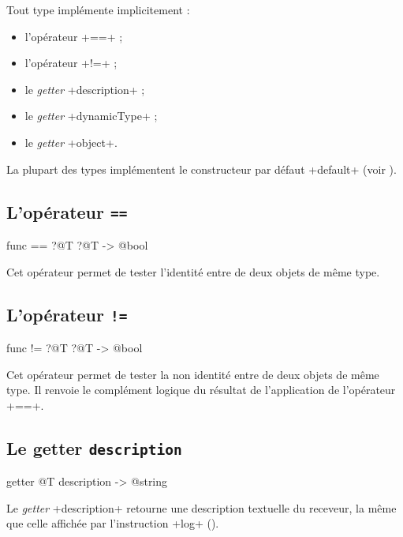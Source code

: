 Tout type implémente implicitement :
\begin{itemize}
  \item l'opérateur \ggs+==+ ;
  \item l'opérateur \ggs+!=+ ;
  \item le \emph{getter} \ggs+description+ ;
  \item le \emph{getter} \ggs+dynamicType+ ;
  \item le \emph{getter} \ggs+object+.
\end{itemize}

La plupart des types implémentent le constructeur par défaut \ggs+default+ (voir ). 


\subsection{L'opérateur \texttt{==}}

\begin{galgas}
func == ?@T ?@T -> @bool
\end{galgas}

Cet opérateur permet de tester l'identité entre de deux objets de même type. 

\subsection{L'opérateur \texttt{!=}}

\begin{galgas}
func != ?@T ?@T -> @bool
\end{galgas}

Cet opérateur permet de tester la non identité entre de deux objets de même type. Il renvoie le complément logique du résultat de l'application de l'opérateur \ggs+==+.





\subsection{Le getter \texttt{description}}

\begin{galgas}
getter @T description -> @string
\end{galgas}

Le \emph{getter} \ggs+description+ retourne une description textuelle du receveur, la même que celle affichée par l'instruction \ggs+log+ ().



